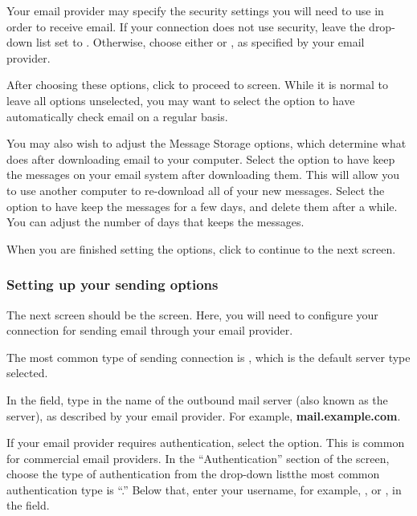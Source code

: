 Your email provider may specify the security settings you will need to use
in order to receive email. If your connection does not use security, leave
the  drop-down list set to .
Otherwise, choose either  or , as specified by your email provider.

After choosing these options, click  to proceed 
to  screen. While it is normal to leave all options
unselected, you may want to select the 
option to have  automatically check email on a regular basis.

You may also wish to adjust the Message Storage options, which determine what
 does after downloading email to your computer. Select the 
 option to have  keep the
messages on your email system after downloading them. This will allow you
to use another computer to re-download all of your new messages. 
Select the  option to have  keep the 
messages for a few days, and delete them after a while. You can adjust the
number of days that  keeps the messages.

When you are finished setting the options, click 
to continue to the next screen.

\subsubsection{Setting up your sending options}

The next screen should be the  screen. Here, you will
need to configure your connection for sending email through your 
email provider.

The most common type of sending connection is , which is the default
server type selected.

In the  field, type in the name of the outbound mail
server (also known as the  server), as described by your
email provider. For example, \textbf{mail.example.com}.

If your email provider requires authentication, select the  option. This is common for commercial email
providers. In the ``Authentication'' section of the screen, choose the
type of authentication from the  drop-down list\dash the most 
common authentication type is ``.'' Below that, enter your username, for example, , or , in the  field.

